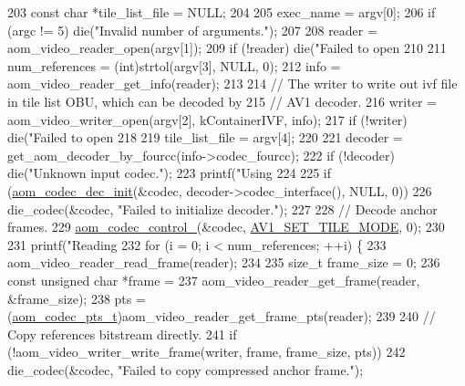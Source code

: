 \begin{DoxyCodeInclude}
{203   \textcolor{keyword}{const} \textcolor{keywordtype}{char} *tile\_list\_file = NULL;
204 
205   exec\_name = argv[0];
206   \textcolor{keywordflow}{if} (argc != 5) die(\textcolor{stringliteral}{"Invalid number of arguments."});
207 
208   reader = aom\_video\_reader\_open(argv[1]);
209   \textcolor{keywordflow}{if} (!reader) die(\textcolor{stringliteral}{"Failed to open %
210 
211   num\_references = (int)strtol(argv[3], NULL, 0);
212   info = aom\_video\_reader\_get\_info(reader);
213 
214   \textcolor{comment}{// The writer to write out ivf file in tile list OBU, which can be decoded by}
215   \textcolor{comment}{// AV1 decoder.}
216   writer = aom\_video\_writer\_open(argv[2], kContainerIVF, info);
217   \textcolor{keywordflow}{if} (!writer) die(\textcolor{stringliteral}{"Failed to open %
218 
219   tile\_list\_file = argv[4];
220 
221   decoder = get\_aom\_decoder\_by\_fourcc(info->codec\_fourcc);
222   \textcolor{keywordflow}{if} (!decoder) die(\textcolor{stringliteral}{"Unknown input codec."});
223   printf(\textcolor{stringliteral}{"Using %
224 
225   \textcolor{keywordflow}{if} (\hyperlink{group__decoder_gafdbfca65b19ab1f6d72b32cd01753b9b}{aom\_codec\_dec\_init}(&codec, decoder->codec\_interface(), NULL, 0))
226     die\_codec(&codec, \textcolor{stringliteral}{"Failed to initialize decoder."});
227 
228   \textcolor{comment}{// Decode anchor frames.}
229   \hyperlink{group__codec_ga51eb332a40dcacc39000ab8e0be36b79}{aom\_codec\_control\_}(&codec, \hyperlink{group__aom__decoder_gga3865fd4b3192489baa9a5c3632ebe97ba0795d8084ae8c78528c01587198df9e2}{AV1\_SET\_TILE\_MODE}, 0);
230 
231   printf(\textcolor{stringliteral}{"Reading %
232   \textcolor{keywordflow}{for} (i = 0; i < num\_references; ++i) \{
233     aom\_video\_reader\_read\_frame(reader);
234 
235     \textcolor{keywordtype}{size\_t} frame\_size = 0;
236     \textcolor{keyword}{const} \textcolor{keywordtype}{unsigned} \textcolor{keywordtype}{char} *frame =
237         aom\_video\_reader\_get\_frame(reader, &frame\_size);
238     pts = (\hyperlink{group__encoder_ga958524226c9a65251c9e4f7bb78fc606}{aom\_codec\_pts\_t})aom\_video\_reader\_get\_frame\_pts(reader);
239 
240     \textcolor{comment}{// Copy references bitstream directly.}
241     \textcolor{keywordflow}{if} (!aom\_video\_writer\_write\_frame(writer, frame, frame\_size, pts))
242       die\_codec(&codec, \textcolor{stringliteral}{"Failed to copy compressed anchor frame."});
}}}}}
\end{DoxyCodeInclude}
